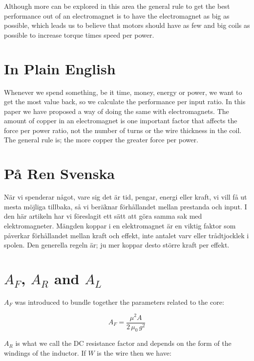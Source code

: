 \documentclass[]{elementary-physics}
\begin{document}
Although more can be explored in this area the general rule to get the best performance out of an electromagnet is to have the electromagnet as big as possible, which leads us to believe that motors should have as few and big coils as possible\cite{jonew} to increase torque times speed per power.

\appendix

\section{In Plain English}

Whenever we spend something, be it time, money, energy or power, we want to get the most value back, so we calculate the performance per input ratio.
In this paper we have proposed a way of doing the same with electromagnets.
The amount of copper in an electromagnet is one important factor that affects the force per power ratio, not the number of turns or the wire thickness in the coil.
The general rule is; the more copper the greater force per power.

\section{På Ren Svenska}

När vi spenderar något, vare sig det är tid, pengar, energi eller kraft, vi vill få ut mesta möjliga tillbaka, så vi beräknar förhållandet mellan prestanda och input.
I den här artikeln har vi föreslagit ett sätt att göra samma sak med elektromagneter.
Mängden koppar i en elektromagnet är en viktig faktor som påverkar förhållandet mellan kraft och effekt, inte antalet varv eller trådtjocklek i spolen.
Den generella regeln är; ju mer koppar desto större kraft per effekt.

\section{$A_F$, $A_R$ and $A_L$}

$A_F$ was introduced to bundle together the parameters related to the core:

\begin{equation}
A_F = \frac{\mu^2 A}{2 \, \mu_0 \, g^2}
\end{equation}

$A_R$ is what we call the DC resistance factor and depends on the form of the windings of the inductor.
If $W$ is the wire then we have:
\end{document}
